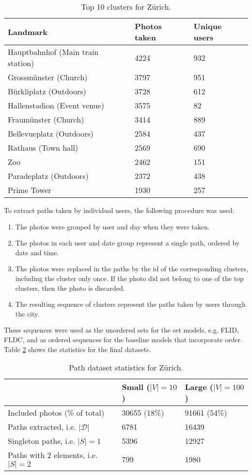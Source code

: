 \begin{table}
  \centering
  \caption{Top 10 clusters for Zürich.}
  \begin{tabular}{@{}lll@{}}
    \toprule
    Landmark & Photos taken & Unique users  \\
    \midrule
    Hauptbahnhof (Main train station) & 4224 & 932 \\
    Grossmünster (Church) & 3797 & 951 \\
    Bürkliplatz (Outdoors) & 3728 & 612 \\
    Hallenstadion (Event venue) & 3575 & 82 \\
    Fraumünster (Church) & 3414 & 889 \\
    Bellevueplatz (Outdoors) & 2584 & 437 \\
    Rathaus (Town hall) & 2569 & 690 \\
    Zoo & 2462 & 151 \\
    Paradeplatz (Outdoors) & 2372 & 438 \\
    Prime Tower & 1930 & 257 \\
    \bottomrule
  \end{tabular}
  \label{tab:top_10_clusters}
\end{table}

To extract paths taken by individual users, the following procedure was used:

\begin{enumerate}
  \item The photos were grouped by user and day when they were taken.
  \item The photos in each user and date group represent a single path, ordered by date and time.
  \item The photos were replaced in the paths by the id of the corresponding clusters, including the cluster only once. If the photo did not belong to one of the top clusters, then the photo is discarded.
  \item The resulting sequence of clusters represent the paths taken by users through the city.
\end{enumerate}

These sequences were used as the unordered sets for the set models, e.g. FLID, FLDC, and as ordered sequences for the baseline models that incorporate order. Table \ref{tab:path-statistics} shows the statistics for the final datasets.

\begin{table}
  \centering
  \caption{Path dataset statistics for Zürich.}
  \begin{tabular}{@{}lll@{}}
    \toprule
    & Small ($|V|=10$)& Large ($|V|=100$)  \\
    \midrule
    Included photos (\% of total) & 30655 (18\%) & 91661 (54\%)\\
    Paths extracted, i.e. $|\mathcal{D}|$ & 6781 & 16439 \\
    Singleton paths, i.e. $|S|=1$ & 5396 & 12927 \\
    Paths with 2 elements, i.e. $|S|=2$ & 799 & 1980 \\
    \bottomrule
  \end{tabular}
  \label{tab:path-statistics}
\end{table}


